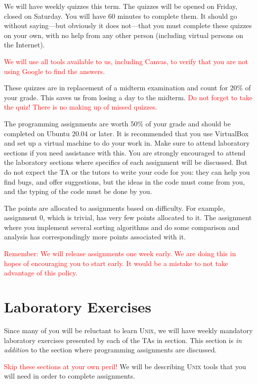 \documentclass{article}
\begin{document}
We will have weekly quizzes this term. The quizzes will be opened on
Friday, closed on Saturday. You will have 60 minutes to complete them.
It should go without saying---but obviously it does not---that you must
complete these quizzes on your own, with no help from any other person
(including virtual persons on the Internet).

\textcolor{red}{We will use all tools available to us, including Canvas,
to verify that you are not using Google to find the answers.}

These quizzes are in replacement of a midterm examination and count for
20\% of your grade. This saves us from losing a day to the midterm.
\textcolor{red}{Do not forget to take the quiz! There is no making up of
missed quizzes.}

The programming assignments are worth 50\% of your grade and should be
completed on Ubuntu 20.04 or later. It is recommended that you use
VirtualBox and set up a virtual machine to do your work in. Make sure to
attend laboratory sections if you need assistance with this. You are
strongly encouraged to attend the laboratory sections where specifics of
each assignment will be discussed. But do not expect the TA or the
tutors to write your code for you: they can help you find bugs, and
offer suggestions, but the ideas in the code must come from you, and the
typing of the code must be done by you.

The points are allocated to assignments based on difficulty. For
example, assignment 0, which is trivial, has very few points allocated
to it. The assignment where you implement several sorting algorithms and
do some comparison and analysis has correspondingly more points
associated with it.

\textcolor{red}{Remember: We will release assignments one week early. We
are doing this in hopes of encouraging you to start early. It would be a
mistake to not take advantage of this policy.}

\section{Laboratory Exercises}

Since many of you will be reluctant to learn \textsc{Unix}, we will have
weekly mandatory laboratory exercises presented by each of the TAs in
section. This section is \emph{in addition} to the section where
programming assignments are discussed.

\textcolor{red}{Skip these sections at your own peril!} We will be
describing \textsc{Unix} tools that you will need in order to complete
assignments.
\end{document}
